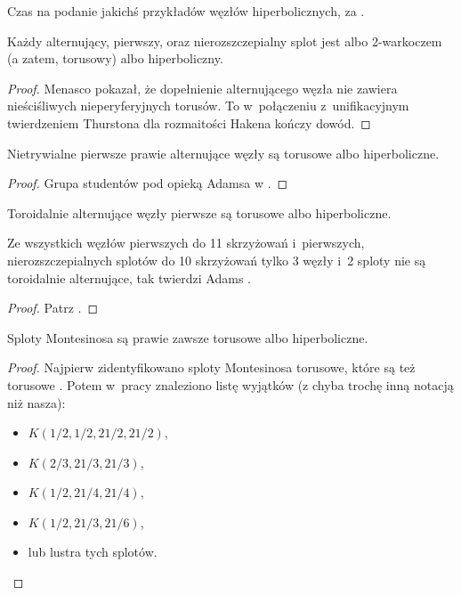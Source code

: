 Czas na podanie jakichś przykładów węzłów hiperbolicznych, za \cite{adams05}.

\begin{proposition}
    Każdy alternujący, pierwszy, oraz nierozszczepialny splot jest albo 2-warkoczem (a zatem, torusowy) albo hiperboliczny.
\end{proposition}

\begin{proof}
    Menasco \cite{menasco84} pokazał, że dopełnienie alternującego węzła nie zawiera nieściśliwych  nieperyferyjnych torusów.
    To w~połączeniu z~unifikacyjnym twierdzeniem Thurstona dla rozmaitości Hakena kończy dowód.
%
\end{proof}

\begin{proposition}
    Nietrywialne pierwsze prawie alternujące węzły są torusowe albo hiperboliczne.
\end{proposition}

\begin{proof}
    Grupa studentów pod opieką Adamsa w \cite{brock92}.
\end{proof}

\begin{proposition}
    Toroidalnie alternujące węzły pierwsze są torusowe albo hiperboliczne.
\end{proposition}

Ze wszystkich węzłów pierwszych do 11 skrzyżowań i~pierwszych, nierozszczepialnych splotów do 10 skrzyżowań tylko 3 węzły i~2 sploty nie są toroidalnie alternujące, tak twierdzi Adams \cite{adams05}.

\begin{proof}
    Patrz \cite{adams994}.
\end{proof}

\begin{proposition}
    Sploty Montesinosa są prawie zawsze torusowe albo hiperboliczne.
\end{proposition}

\begin{proof}
    Najpierw zidentyfikowano sploty Montesinosa torusowe, które są też torusowe \cite{boileau80}.
    Potem w~pracy \cite{oertel84} znaleziono listę wyjątków (z chyba trochę inną notacją niż nasza):
    \begin{itemize}
        \item $K(1/2, 1/2, 21/2, 21/2)$,
        \item $K(2/3, 21/3, 21/3)$,
        \item $K(1/2, 21/4, 21/4)$,
        \item $K(1/2, 21/3, 21/6)$,
        \item lub lustra tych splotów. \qedhere
    \end{itemize}
\end{proof}

